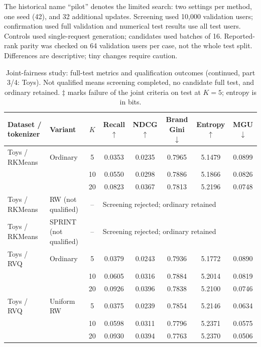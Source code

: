 \begin{table}[p]
\begin{tabular}{llcccccc}
\bottomrule
\end{tabular}
\par\smallskip\footnotesize The historical name ``pilot'' denotes the limited search: two settings per method, one seed (42), and 32 additional updates. Screening used 10,000 validation users; confirmation used full validation and numerical test results use all test users. Controls used single-request generation; candidates used batches of 16. Reported-rank parity was checked on 64 validation users per case, not the whole test split. Differences are descriptive; tiny changes require caution.
\end{table}

\begin{table}[p]
\centering\small
\setlength{\tabcolsep}{3pt}
\addtocounter{table}{-1}
\caption[]{Joint-fairness study: full-test metrics and qualification outcomes (continued, part 3/4: Toys). Not qualified means screening completed, no candidate full test, and ordinary retained. $\ddagger$ marks failure of the joint criteria on test at $K=5$; entropy is in bits.}
\label{tab:joint-fairness-tests-toys}
\begin{tabular}{llcccccc}
\toprule
Dataset / tokenizer & Variant & $K$ & Recall $\uparrow$ & NDCG $\uparrow$ & Brand Gini $\downarrow$ & Entropy $\uparrow$ & MGU $\downarrow$ \\
\midrule
Toys / RKMeans & Ordinary & 5 & 0.0353 & 0.0235 & 0.7965 & 5.1479 & 0.0899 \\
 &  & 10 & 0.0550 & 0.0298 & 0.7886 & 5.1866 & 0.0826 \\
 &  & 20 & 0.0823 & 0.0367 & 0.7813 & 5.2196 & 0.0748 \\
Toys / RKMeans & RW (not qualified) & -- & \multicolumn{5}{l}{Screening rejected; ordinary retained} \\
Toys / RKMeans & SPRINT (not qualified) & -- & \multicolumn{5}{l}{Screening rejected; ordinary retained} \\
\midrule
Toys / RVQ & Ordinary & 5 & 0.0379 & 0.0243 & 0.7936 & 5.1772 & 0.0890 \\
 &  & 10 & 0.0605 & 0.0316 & 0.7884 & 5.2014 & 0.0819 \\
 &  & 20 & 0.0926 & 0.0396 & 0.7838 & 5.2100 & 0.0746 \\
Toys / RVQ & Uniform RW & 5 & 0.0375 & 0.0239 & 0.7854 & 5.2146 & 0.0634 \\
 &  & 10 & 0.0598 & 0.0311 & 0.7796 & 5.2371 & 0.0575 \\
 &  & 20 & 0.0930 & 0.0394 & 0.7763 & 5.2370 & 0.0506 \\

\end{tabular}
\end{table}
